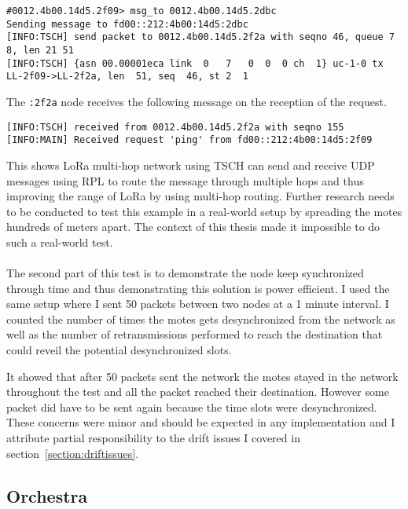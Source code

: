 \begin{lstlisting}[language=none]
#0012.4b00.14d5.2f09> msg_to 0012.4b00.14d5.2dbc
Sending message to fd00::212:4b00:14d5:2dbc
[INFO:TSCH] send packet to 0012.4b00.14d5.2f2a with seqno 46, queue 7 8, len 21 51
[INFO:TSCH] {asn 00.00001eca link  0   7   0  0  0 ch  1} uc-1-0 tx LL-2f09->LL-2f2a, len  51, seq  46, st 2  1
\end{lstlisting}

The \lstinline{:2f2a} node receives the following message on the reception of the
request.

\begin{lstlisting}[language=none]
[INFO:TSCH] received from 0012.4b00.14d5.2f2a with seqno 155
[INFO:MAIN] Received request 'ping' from fd00::212:4b00:14d5:2f09
\end{lstlisting}

This shows LoRa multi-hop network using TSCH can send and receive UDP messages
using RPL to route the message through multiple hops and thus improving the
range of LoRa by using multi-hop routing.
Further research needs to be conducted to test this example in a real-world
setup by spreading the motes hundreds of meters apart.
The context of this thesis made it impossible to do such a real-world test.

\paragraph{}

The second part of this test is to demonstrate the node keep synchronized
through time and thus demonstrating this solution is power efficient.
I used the same setup where I sent 50 packets between two nodes at a 1 minute
interval. I counted the number of times the motes gets desynchronized from the
network as well as the number of retransmissions performed to reach the
destination that could reveil the potential desynchronized slots.

It showed that after 50 packets sent the network the motes
stayed in the network throughout the test and all the packet reached
their destination.
However some packet did have to be sent again because the time slots were
desynchronized.
These concerns were minor and should be expected in any implementation and
I attribute partial responsibility to the drift issues I covered in
section~\ref{section:driftissues}.

\subsection{Orchestra\label{section:tschorchestra}}

